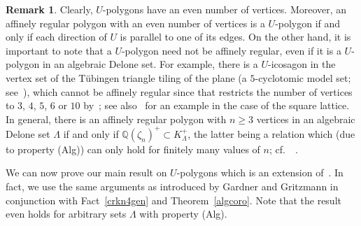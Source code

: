 \documentclass[a4paper]{amsart}
\theoremstyle{definition}
\newtheorem{rem}[theorem]{Remark}
\numberwithin{equation}{section}
\numberwithin{theorem}{section}
\begin{document}
\begin{rem}\label{urem}
Clearly, $U$-polygons have an even number of vertices. Moreover, an
affinely regular polygon with an even number of vertices is a 
$U$-polygon if and only if each direction of $U$ is parallel to one of
its edges. On the other hand, it is important to note that a $U$-polygon need not be affinely regular, even if it is a
$U$-polygon in an algebraic Delone set. For example, there is a
$U$-icosagon in the vertex set of the
T\"ubingen triangle tiling of the plane (a $5$-cyclotomic
model set; see~\cite[Fig.~1,
  Corollary 14 and Example 15]{H4}), which cannot be affinely regular
  since that restricts the number of vertices to $3$, $4$, $5$, $6$ or $10$ by~\cite[Corollary 4.2]{H3}; see also~\cite[Example
  4.3]{GG} for an example in the case of the square lattice. In
  general, there is an affinely regular polygon with $n\geq 3$ vertices in
  an algebraic Delone set $\varLambda$ if and only if
  ${\mathbb{Q}}(\zeta_n)^+\subset K_{\varLambda}^+$, the latter being a relation
  which (due to property (Alg)) can only hold 
  for finitely many values of $n$; cf.~~\cite[Thm.~ 3.3]{H3}.
\end{rem}

We can now prove our main result on $U$-polygons which is an extension
of~\cite[Thm.~
4.5]{GG}. In fact, we use the same
arguments as introduced by Gardner and Gritzmann in conjunction with
Fact~\ref{crkn4gen} and Theorem~\ref{algcoro}. Note that the result
even holds for arbitrary sets $\varLambda$ with property (Alg).
\end{document}
